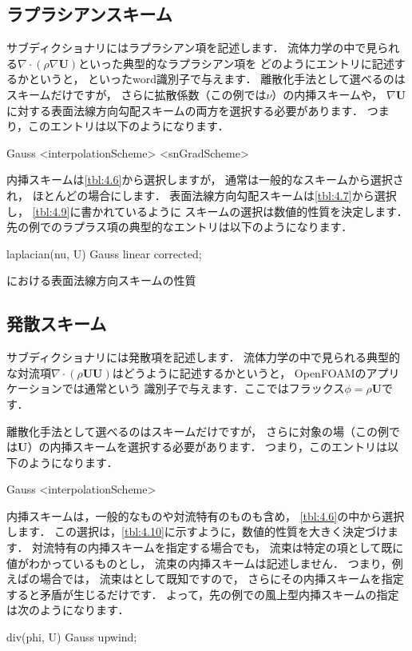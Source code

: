 \subsection{ラプラシアンスキーム}
\label{ssec:4.4.4}
サブディクショナリにはラプラシアン項を記述します．
流体力学の中で見られる$\nabla \cdot (\rho\nabla\bm{U})$といった典型的なラプラシアン項を
どのようにエントリに記述するかというと，
といったword識別子で与えます．
離散化手法として選べるのはスキームだけですが，
さらに拡散係数（この例では$\nu$）の内挿スキームや，
$\nabla\bm{U}$に対する表面法線方向勾配スキームの両方を選択する必要があります．
つまり，このエントリは以下のようになります．
\begin{OFverbatim}[file]
Gauss <interpolationScheme> <snGradScheme>
\end{OFverbatim}
内挿スキームは\autoref{tbl:4.6}から選択しますが，
通常は一般的なスキームから選択され，
ほとんどの場合にします．
表面法線方向勾配スキームは\autoref{tbl:4.7}から選択し，
\autoref{tbl:4.9}に書かれているように
スキームの選択は数値的性質を決定します．
先の例でのラプラス項の典型的なエントリは以下のようになります．
\begin{OFverbatim}[file]
laplacian(nu, U) Gauss linear corrected;
\end{OFverbatim}


\begin{table}[ht]
 
 \caption{における表面法線方向スキームの性質}
 \label{tbl:4.9}
\end{table}


\subsection{発散スキーム}
\label{ssec:4.4.5}
サブディクショナリには発散項を記述します．
流体力学の中で見られる典型的な対流項$\nabla \cdot (\rho\bm{U}\bm{U})$はどうように記述するかというと，
OpenFOAMのアプリケーションでは通常という
識別子で与えます．ここではフラックス$\phi = \rho\bm{U}$です．

離散化手法として選べるのはスキームだけですが，
さらに対象の場（この例では$\bm{U}$）の内挿スキームを選択する必要があります．
つまり，このエントリは以下のようになります．
\begin{OFverbatim}[file]
Gauss <interpolationScheme>
\end{OFverbatim}
内挿スキームは，一般的なものや対流特有のものも含め，
\autoref{tbl:4.6}の中から選択します．
この選択は，\autoref{tbl:4.10}に示すように，数値的性質を大きく決定づけます．
対流特有の内挿スキームを指定する場合でも，
流束は特定の項として既に値がわかっているものとし，
流束の内挿スキームは記述しません．
つまり，例えばの場合では，
流束はとして既知ですので，
さらにその内挿スキームを指定すると矛盾が生じるだけです．
よって，先の例での風上型内挿スキームの指定は次のようになります．
\begin{OFverbatim}[file]
div(phi, U) Gauss upwind;
\end{OFverbatim}


